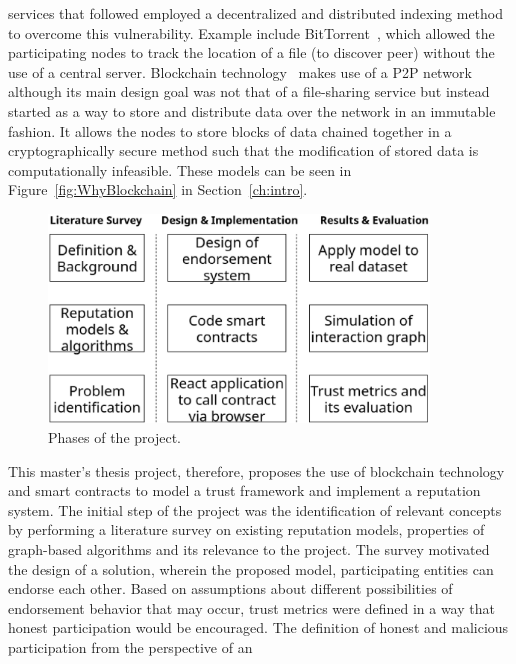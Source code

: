 services that followed employed a decentralized and distributed indexing method
to overcome this vulnerability. Example include
BitTorrent~\cite{cohen2003incentives,cohen2008bittorrent}, which allowed the
participating nodes to track the location of a file (to discover peer) without
the use of a central server. Blockchain technology~\cite{atzori2015blockchain}
makes use of a P2P network although its main design goal was not that of a
file-sharing service but instead started as a way to store and distribute data
over the network in an immutable fashion. It allows the nodes to store blocks
of data chained together in a cryptographically secure method such that the
modification of stored data is computationally infeasible. These models can be
seen in Figure~\ref{fig:WhyBlockchain} in Section~\ref{ch:intro}.  \par
\begin{figure}[H]
	\begin{center}
		\includegraphics[width=0.9\textwidth]{Images/workflow.eps}
		\caption{Phases of the project.}
		\label{fig:thesisSteps}
	\end{center}
\end{figure}
\vspace{-8mm}
This master’s thesis project, therefore, proposes the use of blockchain
technology and smart contracts to model a trust framework and implement a
reputation system. The initial step of the project was the identification of
relevant concepts by performing a literature survey on existing reputation
models, properties of graph-based algorithms and its relevance to the project.
The survey motivated the design of a solution, wherein the proposed model,
participating entities can endorse each other. Based on assumptions about
different possibilities of endorsement behavior that may occur, trust metrics
were defined in a way that honest participation would be encouraged. The
definition of honest and malicious participation from the perspective of an
